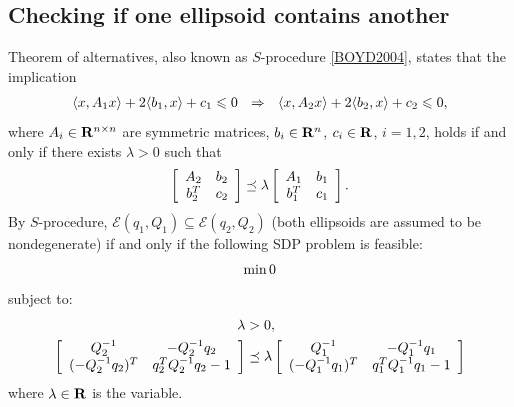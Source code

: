 \documentclass[letterpaper,10pt,english]{sphinxmanual}
\begin{document}
\subsection{Checking if one ellipsoid contains another}
\label{chap_ellcalc:checking-if-one-ellipsoid-contains-another}
Theorem of alternatives, also known as \(S\)-procedure {\hyperref[chap_ellcalc:boyd2004]{{[}BOYD2004{]}}},
states that the implication
\begin{gather}
\begin{split}\langle x, A_1x\rangle + 2\langle b_1,x\rangle + c_1 \leqslant0
~~ \Rightarrow ~~
\langle x, A_2x\rangle + 2\langle b_2,x\rangle + c_2 \leqslant0,\end{split}\notag
\end{gather}
where \(A_i\in{\bf R}^{n\times n}\) are symmetric matrices,
\(b_i\in{\bf R}^n\), \(c_i\in{\bf R}\), \(i=1,2\), holds if
and only if there exists \(\lambda>0\) such that
\begin{gather}
\begin{split}\left[\begin{array}{cc}
A_2 & b_2\\
b_2^T & c_2\end{array}\right]
\preceq
\lambda\left[\begin{array}{cc}
A_1 & b_1\\
b_1^T & c_1\end{array}\right].\end{split}\notag
\end{gather}
By \(S\)-procedure,
\({\mathcal E}(q_1,Q_1)\subseteq{\mathcal E}(q_2,Q_2)\) (both
ellipsoids are assumed to be nondegenerate) if and only if the following
SDP problem is feasible:
\begin{gather}
\begin{split}\min 0\end{split}\notag
\end{gather}
subject to:
\begin{gather}
\begin{split}\begin{aligned}
\lambda & >  0, \\
\left[\begin{array}{cc}
Q_2^{-1} & -Q_2^{-1}q_2\\
(-Q_2^{-1}q_2)^T & q_2^TQ_2^{-1}q_2-1\end{array}\right]
& \preceq
\lambda \left[\begin{array}{cc}
Q_1^{-1} & -Q_1^{-1}q_1\\
(-Q_1^{-1}q_1)^T & q_1^TQ_1^{-1}q_1-1\end{array}\right]\end{aligned}\end{split}\notag
\end{gather}
where \(\lambda\in{\bf R}\) is the variable.
\end{document}
